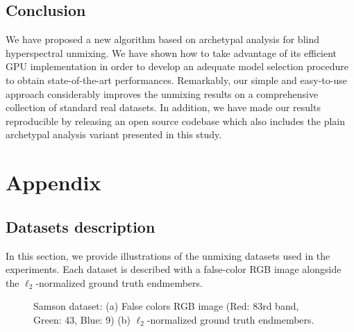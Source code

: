 \section{Conclusion}
\label{sec:EDAA_ccl}

We have proposed a new algorithm based on archetypal analysis for blind
hyperspectral unmixing.
We have shown how to take advantage of its efficient GPU implementation in order
to develop an adequate model selection procedure to obtain state-of-the-art
performances.
Remarkably, our simple and easy-to-use approach considerably improves the unmixing
results on a comprehensive collection of standard real datasets.
In addition, we have made our results reproducible by releasing an open source
codebase which also includes the plain archetypal analysis variant presented in this study.

\chapter*{Appendix}

\section{Datasets description}

In this section, we provide illustrations of the unmixing datasets
used in the experiments. Each dataset is described with a false-color RGB image
alongside the $\ell_2$-normalized ground truth endmembers.


  \begin{figure}[h]
    \centering
    \hfil
    \caption{Samson dataset: (a) False colors RGB image (Red: 83rd band, Green: 43, Blue: 9) (b)
    $\ell_2$-normalized ground truth endmembers.}
    \label{fig:samson}
  \end{figure}

